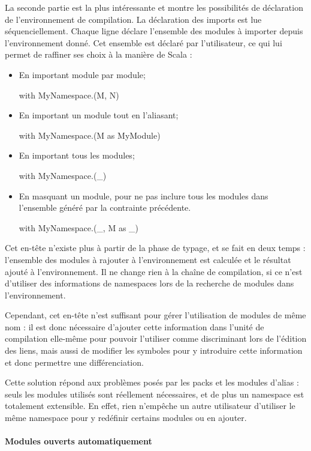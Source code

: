 \documentclass[11pt,a4paper]{report}
\begin{document}
La seconde partie est la plus intéressante et montre les possibilités de
déclaration de l'environnement de compilation. La déclaration des imports est
lue séquenciellement. Chaque ligne déclare l'ensemble des modules à importer
depuis l'environnement donné. Cet ensemble est déclaré par l'utilisateur, ce qui
lui permet de raffiner ses choix à la manière de Scala :
\begin{itemize}
\item En important module par module;
\begin{OCaml}
with MyNamespace.(M, N)
\end{OCaml}
\item En important un module tout en l'aliasant;
\begin{OCaml}
with MyNamespace.(M as MyModule) 
\end{OCaml}
\item En important tous les modules;
\begin{OCaml}
with MyNamespace.(_)
\end{OCaml}
\item En masquant un module, pour ne pas inclure tous les modules dans
  l'ensemble généré par la contrainte précédente.
\begin{OCaml}
with MyNamespace.(_, M as _)
\end{OCaml}
\end{itemize}

Cet en-tête n'existe plus à partir de la phase de typage, et se fait en deux
temps : l'ensemble des modules à rajouter à l'environnement est calculée et le
résultat ajouté à l'environnement. Il ne change rien à la chaîne de compilation,
si ce n'est d'utiliser des informations de namespaces lors de la recherche de
modules dans l'environnement.

Cependant, cet en-tête n'est suffisant pour gérer l'utilisation de modules de
même nom : il est donc nécessaire d'ajouter cette information dans l'unité de
compilation elle-même pour pouvoir l'utiliser comme discriminant lors de
l'édition des liens, mais aussi de modifier les symboles pour y introduire cette
information et donc permettre une différenciation.

Cette solution répond aux problèmes posés par les packs et les modules d'alias :
seuls les modules utilisés sont réellement nécessaires, et de plus un namespace
est totalement extensible. En effet, rien n'empêche un autre utilisateur
d'utiliser le même namespace pour y redéfinir certains modules ou en ajouter.

\paragraph{Modules ouverts automatiquement}
\end{document}
